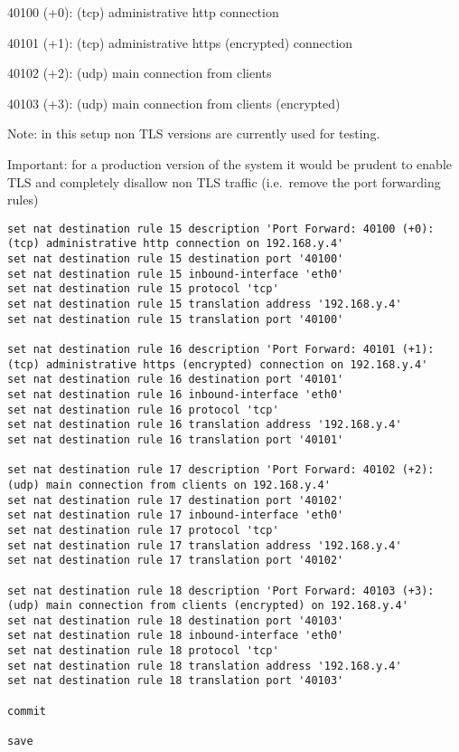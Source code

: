 40100 (+0): (tcp) administrative http connection

40101 (+1): (tcp) administrative https (encrypted) connection

40102 (+2): (udp) main connection from clients

40103 (+3): (udp) main connection from clients (encrypted)

Note: in this setup non TLS versions are currently used for testing.

Important: for a production version of the system it would be prudent to
enable TLS and completely disallow non TLS traffic (i.e.~remove the port
forwarding rules)

\begin{verbatim}
set nat destination rule 15 description 'Port Forward: 40100 (+0): (tcp) administrative http connection on 192.168.y.4'
set nat destination rule 15 destination port '40100'
set nat destination rule 15 inbound-interface 'eth0'
set nat destination rule 15 protocol 'tcp'
set nat destination rule 15 translation address '192.168.y.4'
set nat destination rule 15 translation port '40100'

set nat destination rule 16 description 'Port Forward: 40101 (+1): (tcp) administrative https (encrypted) connection on 192.168.y.4'
set nat destination rule 16 destination port '40101'
set nat destination rule 16 inbound-interface 'eth0'
set nat destination rule 16 protocol 'tcp'
set nat destination rule 16 translation address '192.168.y.4'
set nat destination rule 16 translation port '40101'

set nat destination rule 17 description 'Port Forward: 40102 (+2): (udp) main connection from clients on 192.168.y.4'
set nat destination rule 17 destination port '40102'
set nat destination rule 17 inbound-interface 'eth0'
set nat destination rule 17 protocol 'tcp'
set nat destination rule 17 translation address '192.168.y.4'
set nat destination rule 17 translation port '40102'

set nat destination rule 18 description 'Port Forward: 40103 (+3): (udp) main connection from clients (encrypted) on 192.168.y.4'
set nat destination rule 18 destination port '40103'
set nat destination rule 18 inbound-interface 'eth0'
set nat destination rule 18 protocol 'tcp'
set nat destination rule 18 translation address '192.168.y.4'
set nat destination rule 18 translation port '40103'

commit

save
\end{verbatim}

